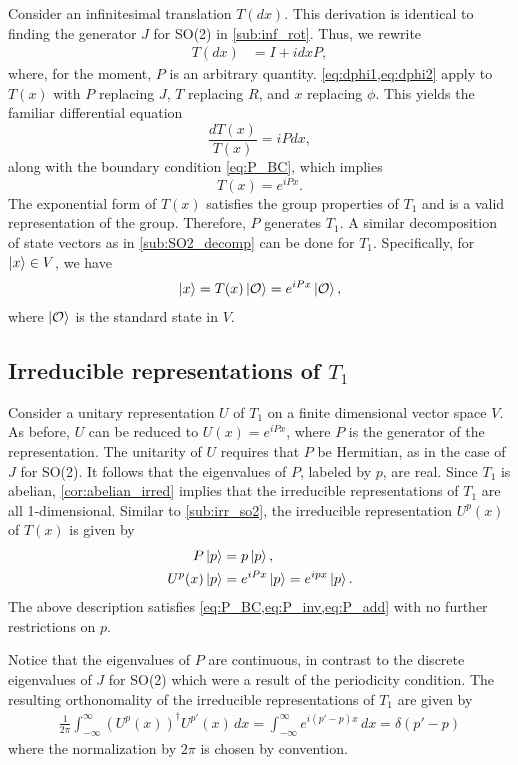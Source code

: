 Consider an infinitesimal translation $T(dx)$. This derivation is identical to finding the generator $J$ for SO(2) in \cref{sub:inf_rot}. Thus, we rewrite
\begin{align*}
    T(dx) &= I + i dx P,
\end{align*}
where, for the moment, $P$ is an arbitrary quantity. \cref{eq:dphi1,eq:dphi2} apply to $T(x)$ with $P$ replacing $J$, $T$ replacing $R$, and $x$ replacing $\phi$. This yields the familiar differential equation
\begin{equation}
    \frac{dT(x)}{T(x)} = iP dx,
\end{equation}
along with the boundary condition \cref{eq:P_BC}, which implies
\begin{equation}
    T(x) = e^{iPx}.
\end{equation}
The exponential form of $T(x)$ satisfies the group properties of $T_1$ and is a valid representation of the group. Therefore, $P$ generates $T_1$. A similar decomposition of state vectors as in \cref{sub:SO2_decomp} can be done for $T_1$. Specifically, for $\ket{x}\in V$, we have
\begin{align*}
    \ket{x} = T(x)\ket{\mathcal{O}} = e^{iPx}\ket{\mathcal{O}},
\end{align*}
where $\ket{\mathcal{O}}$ is the standard state in $V$.

\subsection{Irreducible representations of $T_1$}
Consider a unitary representation $U$ of $T_1$ on a finite dimensional vector space $V$. As before, $U$ can be reduced to $U(x) = e^{iPx}$, where $P$ is the generator of the representation. The unitarity of $U$ requires that $P$ be Hermitian, as in the case of $J$ for SO(2). It follows that the eigenvalues of $P$, labeled by $p$, are real. Since $T_1$ is abelian, \cref{cor:abelian_irred} implies that the irreducible representations of $T_1$ are all 1-dimensional. Similar to \cref{sub:irr_so2}, the irreducible representation $U^p(x)$ of $T(x)$ is given by
\begin{align*}
    P\ket{p} &= p\ket{p}, \\
    U^p(x)\ket{p} &= e^{iPx}\ket{p} = e^{ip x}\ket{p}.
\end{align*}
The above description satisfies \cref{eq:P_BC,eq:P_inv,eq:P_add} with no further restrictions on $p$. 

Notice that the eigenvalues of $P$ are continuous, in contrast to the discrete eigenvalues of $J$ for SO(2) which were a result of the periodicity condition. The resulting orthonomality of the irreducible representations of $T_1$ are given by
\begin{align*}
    \frac{1}{2\pi}\int_{-\infty}^{\infty} {(U^p(x))}^\dagger U^{p'}(x) \,dx = \int_{-\infty}^{\infty} e^{i(p'-p)x} \,dx = \delta(p'-p)
\end{align*}
where the normalization by $2\pi$ is chosen by convention.

